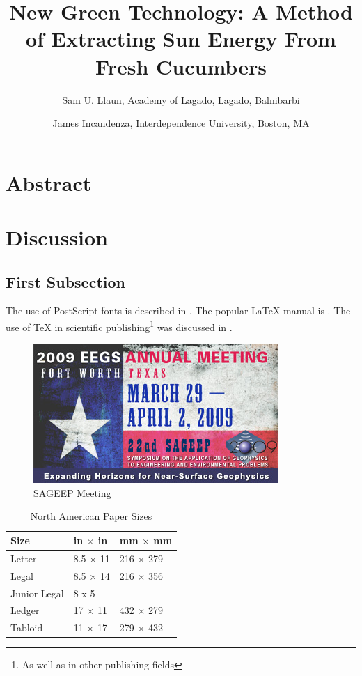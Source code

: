 \documentclass{sageep}
\begin{document}
\title{New Green Technology: A Method of Extracting Sun Energy From
  Fresh Cucumbers} 
\author{Sam U. Llaun, Academy of Lagado, Lagado, Balnibarbi}
\author{James Incandenza, Interdependence University, Boston, MA}
\maketitle

\section{Abstract}

\lipsum[1]

\section{Discussion}



\subsection{First Subsection}

The use of PostScript fonts is described in
\cite{Schmidt04:PSNFSS9.2}.  The popular \LaTeX{} manual is
\cite{Lamport94}.  The use of \TeX{} in scientific
publishing\footnote{As well as in other publishing fields} was
discussed in \cite{Flynn01:TeXMassMarket}. 


\begin{figure}[bhp]
  \includegraphics{sageep_graphic2009}
  \caption{SAGEEP Meeting}
  \label{fig:sageep}
\end{figure}

\begin{table}[htbp]
  \caption{North American Paper Sizes}
  \label{tab:paper}
  \begin{tabular}{lll}
    \hline
    Size & in $\times$ in &mm $\times$ mm\\
    \hline
    Letter &8.5 $\times$ 11 &216 $\times$ 279\\
    Legal &8.5 $\times$ 14 &216 $\times$ 356\\
    Junior Legal &8 x 5 &\\
    Ledger &17 $\times$ 11 &432 $\times$ 279\\
    Tabloid &11 $\times$ 17 &279 $\times$ 432\\
    \hline
  \end{tabular}
\end{table}
\end{document}
